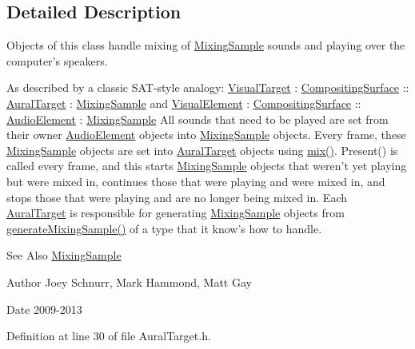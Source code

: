 \subsection{Detailed Description}
Objects of this class handle mixing of \hyperlink{class_picto_1_1_mixing_sample}{Mixing\-Sample} sounds and playing over the computer's speakers. 

As described by a classic S\-A\-T-\/style analogy\-: \hyperlink{class_picto_1_1_visual_target}{Visual\-Target} \-: \hyperlink{struct_picto_1_1_compositing_surface}{Compositing\-Surface} \-:\-: \hyperlink{class_picto_1_1_aural_target}{Aural\-Target} \-: \hyperlink{class_picto_1_1_mixing_sample}{Mixing\-Sample} and \hyperlink{struct_picto_1_1_visual_element}{Visual\-Element} \-: \hyperlink{struct_picto_1_1_compositing_surface}{Compositing\-Surface} \-:\-: \hyperlink{class_picto_1_1_audio_element}{Audio\-Element} \-: \hyperlink{class_picto_1_1_mixing_sample}{Mixing\-Sample} All sounds that need to be played are set from their owner \hyperlink{class_picto_1_1_audio_element}{Audio\-Element} objects into \hyperlink{class_picto_1_1_mixing_sample}{Mixing\-Sample} objects. Every frame, these \hyperlink{class_picto_1_1_mixing_sample}{Mixing\-Sample} objects are set into \hyperlink{class_picto_1_1_aural_target}{Aural\-Target} objects using \hyperlink{class_picto_1_1_aural_target_af4ae061fb6f1edb78843d9b1ac69fd0b}{mix()}. Present() is called every frame, and this starts \hyperlink{class_picto_1_1_mixing_sample}{Mixing\-Sample} objects that weren't yet playing but were mixed in, continues those that were playing and were mixed in, and stops those that were playing and are no longer being mixed in. Each \hyperlink{class_picto_1_1_aural_target}{Aural\-Target} is responsible for generating \hyperlink{class_picto_1_1_mixing_sample}{Mixing\-Sample} objects from \hyperlink{class_picto_1_1_aural_target_a1de8975e412fba2acb355f4a0d68997d}{generate\-Mixing\-Sample()} of a type that it know's how to handle. \begin{DoxySeeAlso}{See Also}
\hyperlink{class_picto_1_1_mixing_sample}{Mixing\-Sample} 
\end{DoxySeeAlso}
\begin{DoxyAuthor}{Author}
Joey Schnurr, Mark Hammond, Matt Gay 
\end{DoxyAuthor}
\begin{DoxyDate}{Date}
2009-\/2013 
\end{DoxyDate}


Definition at line 30 of file Aural\-Target.\-h.



